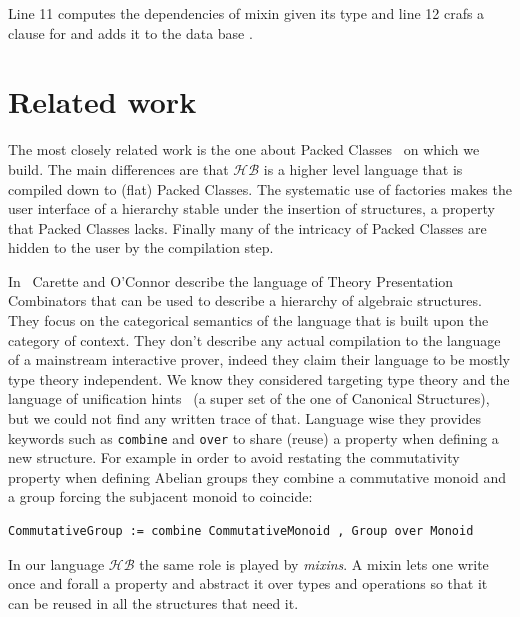 \documentclass[a4paper,UKenglish,cleveref, autoref]{lipics-v2019}
\newcommand{\HB}{\ensuremath{\mathcal{HB}}}
\newcommand{\mixin}{mixin}
\newcommand{\mixins}{mixins}
\newcommand{\factories}{factories}
\theoremstyle{implem}
\theoremstyle{implem}
\theoremstyle{axiom}
\theoremstyle{abscommand}
\theoremstyle{command}
\begin{document}
{{Line 11 computes the dependencies of \mixin{}  given
its type and line 12 crafs a clause for  and
adds it to the data base .


\section{Related work}
The most closely related work is the one about Packed Classes~\cite{DBLP:conf/tphol/GarillotGMR09} on which we
build. The main differences are that \HB{} is a higher level language
that is compiled down to (flat) Packed Classes. The systematic use of
\factories{} makes the user interface of a hierarchy stable under the insertion of
structures, a property that Packed Classes lacks.
Finally many of the intricacy of Packed Classes are hidden to the user by
the compilation step.

In~\cite{CaretteCombinators} Carette and O'Connor describe the language of
Theory Presentation Combinators that can be used to describe a hierarchy of
algebraic structures.
They focus on the categorical semantics of the language that is built upon
the category of context.
They don't describe any actual compilation to the language of a mainstream
interactive prover, indeed they claim their language to be mostly type theory
independent. We know they considered targeting type theory and the language
of unification hints~\cite{10.1007/978-3-642-03359-9_8}
(a super set of the one of Canonical Structures),
but we could not find any written trace of that. Language wise they provides
keywords such as \verb+combine+ and \verb+over+ to share (reuse) a property
when defining a new structure. For example in order to avoid restating
the commutativity property when defining Abelian groups they combine
a commutative monoid and a group forcing the subjacent monoid to coincide:
\begin{verbatim}
CommutativeGroup := combine CommutativeMonoid , Group over Monoid
\end{verbatim}
In our language \HB{} the same role is played by \emph{\mixins{}}.
A \mixin{} lets one write once and forall a property and abstract it over types
and operations so that it can be reused in all the structures that need it.

}}
\end{document}
